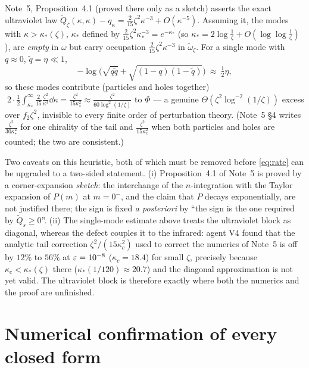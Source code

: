 \documentclass[11pt]{article}
\newcommand{\Qt}{\widetilde Q}
\theoremstyle{definition}\newtheorem{problem}[theorem]{Problem}
\begin{document}
Note~5, Proposition~4.1 (proved there only as a sketch) asserts the exact ultraviolet law
\(\Qt_\zeta(\kappa,\kappa)-q_\kappa=\frac2{15}\zeta^2\kappa^{-3}+O(\kappa^{-5})\).  Assuming it, the
modes with \(\kappa>\kappa_*(\zeta)\), \(\kappa_*\) defined by
\(\frac2{15}\zeta^2\kappa_*^{-3}=e^{-\kappa_*}\) (so \(\kappa_*=2\log\frac1\zeta+O(\log\log\frac1\zeta)\)),
are \emph{empty} in \(\omega\) but carry occupation \(\frac2{15}\zeta^2\kappa^{-3}\) in
\(\widetilde\omega_\zeta\).  For a single mode with \(q\approx0\), \(\tilde q=\eta\ll1\),
\[
 -\log\bigl(\sqrt{q\tilde q}+\sqrt{(1-q)(1-\tilde q)}\bigr)\ \approx\ \tfrac12\eta ,
\]
so these modes contribute (particles and holes together)
\(\;2\cdot\frac12\int_{\kappa_*}^\infty\frac2{15}\frac{\zeta^2}{\kappa^3}\dd\kappa
=\frac{\zeta^2}{15\kappa_*^2}\approx\frac{\zeta^2}{60\log^2(1/\zeta)}\)
to \(\Phi\) --- a genuine \(\Theta(\zeta^2\log^{-2}(1/\zeta))\) excess over \(f_2\zeta^2\), invisible
to every finite order of perturbation theory.  (Note~5 \S4 writes
\(\frac{\zeta^2}{30\kappa_*^2}\) for one chirality of the tail and
\(\frac{\zeta^2}{15\kappa_c^2}\) when both particles and holes are counted; the two are consistent.)

\begin{verdictgap}
Two caveats on this heuristic, both of which must be removed before \eqref{eq:rate} can be upgraded
to a two-sided statement.  (i) Proposition~4.1 of Note~5 is proved by a corner-expansion
\emph{sketch}: the interchange of the \(n\)-integration with the Taylor expansion of \(P(m)\) at
\(m=0^-\), and the claim that \(P\) decays exponentially, are not justified there; the sign is fixed
\emph{a posteriori} by ``the sign is the one required by \(\Qt_s\ge0\)''.  (ii) The single-mode
estimate above treats the ultraviolet block as diagonal, whereas the defect couples it to the
infrared: agent V4 found that the analytic tail correction \(\zeta^2/(15\kappa_c^2)\) used to correct
the numerics of Note~5 is off by \(12\%\) to \(56\%\) at \(\varepsilon=10^{-8}\)
(\(\kappa_c=18.4\)) for small \(\zeta\), precisely because \(\kappa_c<\kappa_*(\zeta)\) there
(\(\kappa_*(1/120)\approx20.7\)) and the diagonal approximation is not yet valid.  The ultraviolet
block is therefore exactly where both the numerics and the proof are unfinished.
\end{verdictgap}

\section{Numerical confirmation of every closed form}\label{sec:num}
\end{document}
